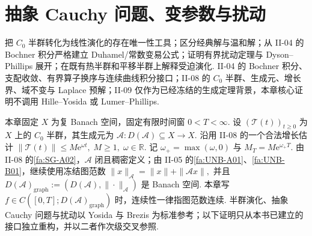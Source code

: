 \chapter{抽象 Cauchy 问题、变参数与扰动}\label{chap:II-11}
\FAChapterOpening
{把 \(\displaystyle C_0\) 半群转化为线性演化的存在唯一性工具；区分经典解与温和解；从 II-04 的 Bochner 积分严格建立 Duhamel/常数变易公式；证明有界扰动定理与 Dyson--Phillips 展开；在既有热半群和平移半群上解释受迫演化.}
{II-04 的 Bochner 积分、支配收敛、有界算子换序与连续曲线积分接口；II-08 的 \(\displaystyle C_0\) 半群、生成元、增长界、域不变与 Laplace 预解；II-09 仅作为已经冻结的生成定理背景，本章核心证明不调用 Hille--Yosida 或 Lumer--Phillips.}
{\begin{center}
\end{center}}

本章固定 \(\displaystyle X\) 为复 Banach 空间，固定有限时间窗 \(\displaystyle 0<T<\infty\). 设 \(\displaystyle(\mathcal T(t))_{t\geqslant0}\) 为 \(\displaystyle X\) 上的 \(\displaystyle C_0\) 半群，其生成元为 \(\displaystyle \mathcal A:D(\mathcal A)\subseteq X\to X.\)
沿用 II-08 的一个合法增长估计 \(\displaystyle \|\mathcal T(t)\| \leqslant M\mathrm{e}^{\omega t}, \; M\geqslant1, \; \omega\in\mathbb R.\)
记 \(\displaystyle\omega_+=\max(\omega,0)\) 与 \(\displaystyle M_T=M\mathrm{e}^{\omega_+T}\). 由 II-08 的\autoref{fa:SG-A02}，\(\displaystyle\mathcal A\) 闭且稠密定义；由 II-05 的\autoref{fa:UNB-A01}、\autoref{fa:UNB-B01}，继续使用冻结图范数 \(\displaystyle \|x\|_{\mathcal A} = \|x\|+\|\mathcal Ax\|,\)
并且 \(\displaystyle D(\mathcal A)_{\mathrm{graph}}:=(D(\mathcal A),\|\cdot\|_{\mathcal A})\) 是 Banach 空间. 本章写 \(\displaystyle f\in C([0,T];D(\mathcal A)_{\mathrm{graph}})\) 时，连续性一律指图范数连续. 半群演化、抽象 Cauchy 问题与扰动以 Yosida 与 Brezis 为标准参考；以下证明只从本书已建立的接口独立重构，并以二者作次级交叉参照\cite{yosida,brezis2011}.

